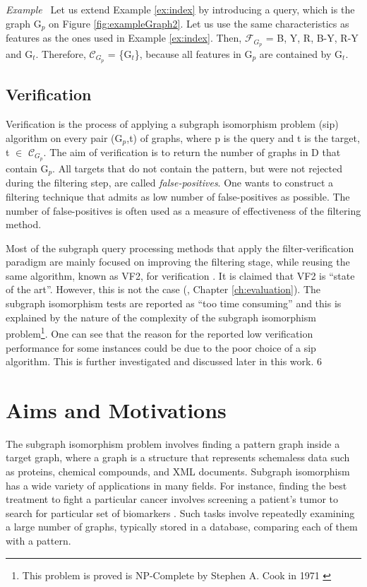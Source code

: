 \documentclass{l4proj}
\newcounter{example}[section]
\newenvironment{example}[1][]{\refstepcounter{example}\par\medskip
   \noindent \textit{Example~\theexample #1} \rmfamily}{\medskip}
\newcommand{\fancyC}{\mathcal{C}}
\newcommand{\fancyF}{\mathcal{F}}
\begin{document}
\begin{example}
Let us extend Example \ref{ex:index} by introducing a query, which is the graph G$_{p}$ on Figure \ref{fig:exampleGraph2}. Let us use the same characteristics as features as the ones used in Example \ref{ex:index}. Then, $\fancyF_{G_{p}}$ = B, Y, R, B-Y, R-Y and G$_{t}$. Therefore, $\fancyC_{G_{p}}$ = \{G$_{t}$\}, because all features in G$_{p}$ are contained by G$_{t}$.
\end{example}

\subsection{Verification}
Verification is the process of applying a subgraph isomorphism problem (\gls{sip}) algorithm on every pair (G$_{p}$,t) of graphs, where p is the query and t is the target, t $\in$ $\fancyC_{G_{p}}$. The aim of verification is to return the number of graphs in D that contain G$_{p}$. All targets that do not contain the pattern, but were not rejected during the filtering step, are called \emph{false-positives}. One wants to construct a filtering technique that admits as low number of false-positives as possible. The number of false-positives is often used as a measure of effectiveness of the filtering method\cite{foteini}.

Most of the subgraph query processing methods that apply the filter-verification paradigm are mainly focused on improving the filtering stage, while reusing the same algorithm, known as VF2, for verification \cite{foteini}. 
It is claimed that VF2 is ``state of the art''\cite{ctindex}. However, this is not the case (\cite{Solnon:2010, Larrosa:2002, Bonnici:2013, Zampelli:2010, CP2015}, Chapter \ref{ch:evaluation}). The subgraph isomorphism tests are reported as ``too time consuming''\cite{foteini} and this is explained by the nature of the complexity of the subgraph isomorphism problem\footnote{This problem is proved is NP-Complete by Stephen A. Cook in 1971 \cite{Cook:1971}}\cite{ctindex,foteini,freqStructBasedIndexing}. One can see that the reason for the reported low verification performance for some instances could be due to the poor choice of a \gls{sip} algorithm. This is further investigated and discussed later in this work. 6  

\section{Aims and Motivations}
The subgraph isomorphism problem involves finding a pattern graph inside a target graph, where a graph is a structure that represents schemaless data such as proteins, chemical compounds, and XML documents. Subgraph isomorphism has a wide variety of applications in many fields. For instance, finding the best treatment to fight a particular cancer involves screening a patient's tumor to search for particular set of biomarkers \cite{nature:2015}. Such tasks involve repeatedly examining a large number of graphs, typically stored in a database, comparing each of them with a pattern.
\end{document}
